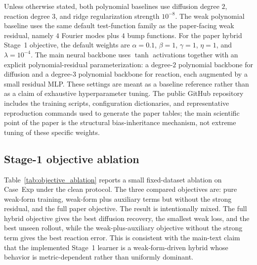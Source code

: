 \documentclass[preprint,12pt]{elsarticle}
\begin{document}
Unless otherwise stated, both polynomial baselines use diffusion degree $2$, reaction degree $3$, and ridge regularization strength $10^{-8}$. The weak polynomial baseline uses the same default test-function family as the paper-facing weak residual, namely $4$ Fourier modes plus $4$ bump functions.
For the paper hybrid Stage~1 objective, the default weights are $\alpha=0.1$, $\beta=1$, $\gamma=1$, $\eta=1$, and $\lambda=10^{-4}$. The main neural backbone uses $\tanh$ activations together with an explicit polynomial-residual parameterization: a degree-$2$ polynomial backbone for diffusion and a degree-$3$ polynomial backbone for reaction, each augmented by a small residual MLP. These settings are meant as a baseline reference rather than as a claim of exhaustive hyperparameter tuning. The public GitHub repository includes the training scripts, configuration dictionaries, and representative reproduction commands used to generate the paper tables; the main scientific point of the paper is the structural bias-inheritance mechanism, not extreme tuning of these specific weights.

\subsection{Stage-1 objective ablation}

Table~\ref{tab:objective_ablation} reports a small fixed-dataset ablation on Case~Exp under the clean protocol. The three compared objectives are: pure weak-form training, weak-form plus auxiliary terms but without the strong residual, and the full paper objective. The result is intentionally mixed. The full hybrid objective gives the best diffusion recovery, the smallest weak loss, and the best unseen rollout, while the weak-plus-auxiliary objective without the strong term gives the best reaction error. This is consistent with the main-text claim that the implemented Stage~1 learner is a weak-form-driven hybrid whose behavior is metric-dependent rather than uniformly dominant.
\end{document}
